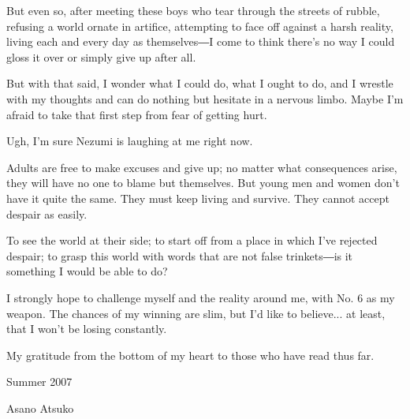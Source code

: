 But even so, after meeting these boys who tear through the streets of
rubble, refusing a world ornate in artifice, attempting to face off
against a harsh reality, living each and every day as themselves―I come
to think there's no way I could gloss it over or simply give up after
all.

But with that said, I wonder what I could do, what I ought to do, and I
wrestle with my thoughts and can do nothing but hesitate in a nervous
limbo. Maybe I'm afraid to take that first step from fear of getting
hurt.

Ugh, I'm sure Nezumi is laughing at me right now.

Adults are free to make excuses and give up; no matter what consequences
arise, they will have no one to blame but themselves. But young men and
women don't have it quite the same. They must keep living and survive.
They cannot accept despair as easily.

To see the world at their side; to start off from a place in which I've
rejected despair; to grasp this world with words that are not false
trinkets―is it something I would be able to do?

I strongly hope to challenge myself and the reality around me, with No.
6 as my weapon. The chances of my winning are slim, but I'd like to
believe... at least, that I won't be losing constantly.

My gratitude from the bottom of my heart to those who have read thus
far.

Summer 2007

Asano Atsuko
